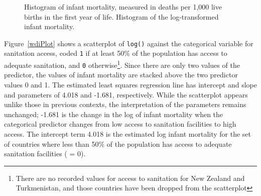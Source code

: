 \begin{figure}[ht]
	\centering
	\caption{ Histogram of infant mortality, measured in deaths per 1,000 live births in the first year of life.  Histogram of the log-transformed infant mortality.}
	\label{wdiHistTransform}
\end{figure}


Figure~\ref{wdiPlot} shows a scatterplot of \texttt{log()} against the categorical variable for sanitation access, coded \texttt{1} if at least 50\% of the population has access to adequate sanitation, and \texttt{0} otherwise\footnote{There are no recorded values for access to sanitation for New Zealand and Turkmenistan, and those countries have been dropped from the scatterplot}. Since there are only two values of the predictor, the values of infant mortality are stacked above the two predictor values 0 and 1. The estimated least squares regression line has intercept and slope and parameters of 4.018 and -1.681, respectively. While the scatterplot appears unlike those in previous contexts, the interpretation of the parameters remains unchanged; -1.681 is the change in the log of infant mortality when the categorical predictor changes from low access to sanitation facilities to high access. The intercept term 4.018 is the estimated log infant mortality for the set of countries where less than 50\% of the population has access to adequate sanitation facilities ( = 0).

